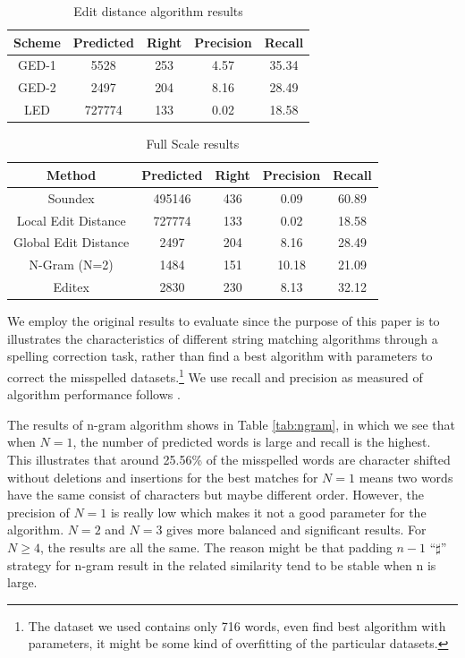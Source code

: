 \documentclass[11pt]{article}
\begin{document}
\begin{table}
	\small
	\centering
	\begin{tabular}{c|c|c|c|c}
		\hline
		Scheme &Predicted & Right & Precision & Recall \\
		\hline
		GED-1 & 5528 & 253 & 4.57 & 35.34 \\
		\hline
		GED-2 & 2497 & 204 & 8.16 & 28.49 \\
		\hline
		LED & 727774 & 133 & 0.02 & 18.58 \\
		\hline
	\end{tabular}
	\caption{Edit distance algorithm results}
	\label{tab:editdis}
\end{table}

\begin{table}
	\centering
	\small
	\begin{tabular}{c|c|c|c|c}
		\hline
		Method &Predicted & Right & Precision & Recall \\
		\hline
		Soundex & 495146 & 436 & 0.09 & 60.89 \\
		\hline
		Local Edit Distance  & 727774 & 133 & 0.02 & 18.58 \\
		\hline
		Global Edit Distance  & 2497 & 204 & 8.16 & 28.49 \\
		\hline
		N-Gram (N=2) & 1484 & 151 & 10.18 & 21.09 \\
		\hline
		Editex & 2830 & 230 & 8.13 & 32.12 \\
		\hline
	\end{tabular}
	\caption{Full Scale results}
	\label{tab:result}
\end{table}

We employ the original results to evaluate since the purpose of this paper is to illustrates the characteristics of different string matching algorithms through a spelling correction task, rather than find a best algorithm with parameters to correct the misspelled datasets.\footnote{The dataset we used contains only 716 words, even find best algorithm with parameters, it might be some kind of overfitting of the particular datasets.} We use recall and precision as measured of algorithm performance follows \cite{Raghavan1989}.

The results of n-gram algorithm shows in Table \ref{tab:ngram}, in which we see that when $N=1$, the number of predicted words is large and recall is the highest. This illustrates that around 25.56\% of the misspelled words are character shifted without deletions and insertions for the best matches for $N=1$ means two words have the same consist of characters but maybe different order. However, the precision of $N=1$ is really low which makes it not a good parameter for the algorithm. $N=2$ and $N=3$ gives more balanced and significant results. For $N\geq 4$, the results are all the same. The reason might be that padding $n-1$ ``$\sharp$'' strategy for n-gram result in the related similarity tend to be stable when n is large. 
\end{document}
